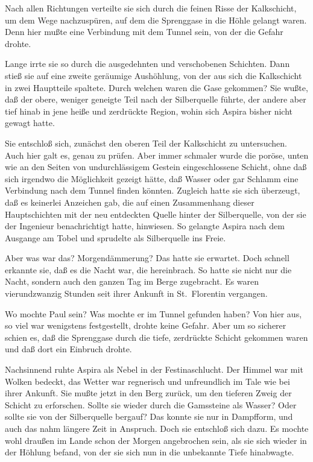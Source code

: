 Nach allen Richtungen verteilte sie sich durch die feinen Risse der
Kalkschicht, um dem Wege nachzuspüren, auf dem die Sprenggase in
die Höhle gelangt waren. Denn hier mußte eine Verbindung mit dem
Tunnel sein, von der die Gefahr drohte.

Lange irrte sie so durch die ausgedehnten und verschobenen
Schichten. Dann stieß sie auf eine zweite geräumige Aushöhlung, von
der aus sich die Kalkschicht in zwei Hauptteile spaltete. Durch
welchen waren die Gase gekommen? Sie wußte, daß der obere, weniger
geneigte Teil nach der Silberquelle führte, der andere aber tief
hinab in jene heiße und zerdrückte Region, wohin sich Aspira bisher
nicht gewagt hatte.

Sie entschloß sich, zunächst den oberen Teil der Kalkschicht zu
untersuchen. Auch hier galt es, genau zu prüfen. Aber immer
schmaler wurde die poröse, unten wie an den Seiten von
undurchlässigem Gestein eingeschlossene Schicht, ohne daß sich
irgendwo die Möglichkeit gezeigt hätte, daß Wasser oder gar Schlamm
eine Verbindung nach dem Tunnel finden könnten. Zugleich hatte sie
sich überzeugt, daß es keinerlei Anzeichen gab, die auf einen
Zusammenhang dieser Hauptschichten mit der neu entdeckten Quelle
hinter der Silberquelle, von der sie der Ingenieur benachrichtigt
hatte, hinwiesen. So gelangte Aspira nach dem Ausgange am Tobel und
sprudelte als Silberquelle ins Freie.

Aber was war das? Morgendämmerung? Das hatte sie erwartet. Doch
schnell erkannte sie, daß es die Nacht war, die hereinbrach. So
hatte sie nicht nur die Nacht, sondern auch den ganzen Tag im Berge
zugebracht. Es waren vierundzwanzig Stunden seit ihrer Ankunft in
St.~Florentin vergangen.

Wo mochte Paul sein? Was mochte er im Tunnel gefunden haben? Von
hier aus, so viel war wenigstens festgestellt, drohte keine Gefahr.
Aber um so sicherer schien es, daß die Sprenggase durch die tiefe,
zerdrückte Schicht gekommen waren und daß dort ein Einbruch
drohte.

Nachsinnend ruhte Aspira als Nebel in der Festinaschlucht. Der
Himmel war mit Wolken bedeckt, das Wetter war regnerisch und
unfreundlich im Tale wie bei ihrer Ankunft. Sie mußte jetzt in den
Berg zurück, um den tieferen Zweig der Schicht zu erforschen.
Sollte sie wieder durch die Gamssteine als Wasser? Oder sollte sie
von der Silberquelle bergauf? Das konnte sie nur in Dampfform, und
auch das nahm längere Zeit in Anspruch. Doch sie entschloß sich
dazu. Es mochte wohl draußen im Lande schon der Morgen angebrochen
sein, als sie sich wieder in der Höhlung befand, von der sie sich
nun in die unbekannte Tiefe hinabwagte.

